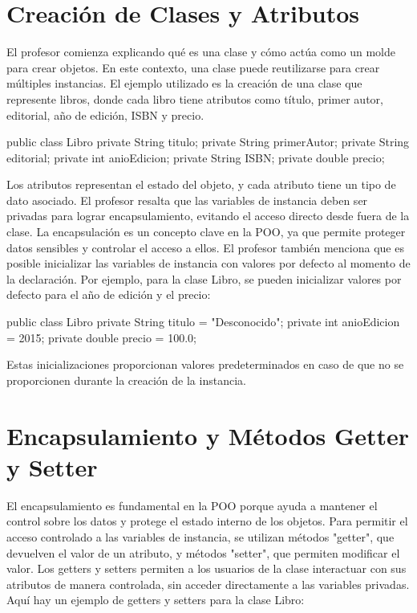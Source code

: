 \documentclass[a4paper]{report}
\begin{document}
\section{Creación de Clases y Atributos}
El profesor comienza explicando qué es una clase y cómo actúa como un molde para crear objetos. En este contexto, una clase puede reutilizarse para crear múltiples instancias. El ejemplo utilizado es la creación de una clase que represente libros, donde cada libro tiene atributos como título, primer autor, editorial, año de edición, ISBN y precio.

\begin{roundedlst}
public class Libro {
    private String titulo;
    private String primerAutor;
    private String editorial;
    private int anioEdicion;
    private String ISBN;
    private double precio;
}
\end{roundedlst}

Los atributos representan el estado del objeto, y cada atributo tiene un tipo de dato asociado. El profesor resalta que las variables de instancia deben ser privadas para lograr encapsulamiento, evitando el acceso directo desde fuera de la clase. La encapsulación es un concepto clave en la POO, ya que permite proteger datos sensibles y controlar el acceso a ellos. El profesor también menciona que es posible inicializar las variables de instancia con valores por defecto al momento de la declaración. Por ejemplo, para la clase Libro, se pueden inicializar valores por defecto para el año de edición y el precio:

\begin{roundedlst}
public class Libro {
    private String titulo = "Desconocido";
    private int anioEdicion = 2015;
    private double precio = 100.0;
}
\end{roundedlst}

Estas inicializaciones proporcionan valores predeterminados en caso de que no se proporcionen durante la creación de la instancia.

\section{Encapsulamiento y Métodos Getter y Setter}
El encapsulamiento es fundamental en la POO porque ayuda a mantener el control sobre los datos y protege el estado interno de los objetos. Para permitir el acceso controlado a las variables de instancia, se utilizan métodos "getter", que devuelven el valor de un atributo, y métodos "setter", que permiten modificar el valor. Los getters y setters permiten a los usuarios de la clase interactuar con sus atributos de manera controlada, sin acceder directamente a las variables privadas. Aquí hay un ejemplo de getters y setters para la clase Libro:
\end{document}
